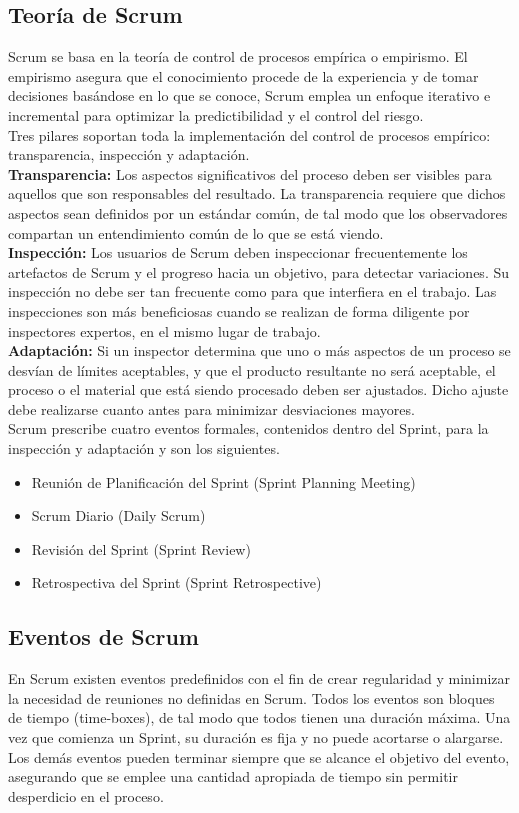 \subsection{Teoría de Scrum}
Scrum se basa en la teoría de control de procesos empírica o empirismo. El empirismo asegura que el conocimiento procede de la experiencia y de tomar decisiones basándose en lo que se conoce, Scrum emplea un enfoque iterativo e incremental para optimizar la predictibilidad y el control del riesgo. \\

Tres pilares soportan toda la implementación del control de procesos empírico: transparencia, inspección y adaptación. \\

\textbf{Transparencia:} Los aspectos significativos del proceso deben ser visibles para aquellos que son responsables del resultado. La transparencia requiere que dichos aspectos sean definidos por un estándar común, de tal modo que los observadores compartan un entendimiento común de lo que se está viendo.  \\
\textbf{Inspección:} Los usuarios de Scrum deben inspeccionar frecuentemente los artefactos de Scrum y el progreso hacia un objetivo, para detectar variaciones. Su inspección no debe ser tan frecuente como para que interfiera en el trabajo. Las inspecciones son más beneficiosas cuando se realizan de forma diligente por inspectores expertos, en el mismo lugar de trabajo. \\ 
\textbf{Adaptación:} Si un inspector determina que uno o más aspectos de un proceso se desvían de límites aceptables, y que el producto resultante no será aceptable, el proceso o el material que está siendo procesado deben ser ajustados. Dicho ajuste debe realizarse cuanto antes para minimizar desviaciones mayores.  \\

Scrum prescribe cuatro eventos formales, contenidos dentro del Sprint, para la inspección y adaptación y son los siguientes.
  \begin{itemize}
	\item Reunión de Planificación del Sprint (Sprint Planning Meeting)
	\item Scrum Diario (Daily Scrum)
	\item Revisión del Sprint (Sprint Review)
	\item Retrospectiva del Sprint (Sprint Retrospective)
  \end{itemize}
  
  \subsection{Eventos de Scrum}
  En Scrum existen eventos predefinidos con el fin de crear regularidad y minimizar la necesidad de reuniones no definidas en Scrum. Todos los eventos son bloques de tiempo (time-boxes), de tal modo que todos tienen una duración máxima. Una vez que comienza un Sprint, su duración es fija y no puede acortarse o alargarse. Los demás eventos pueden terminar siempre que se alcance el objetivo del evento, asegurando que se emplee una cantidad apropiada de tiempo sin permitir desperdicio en el proceso. \\
  

